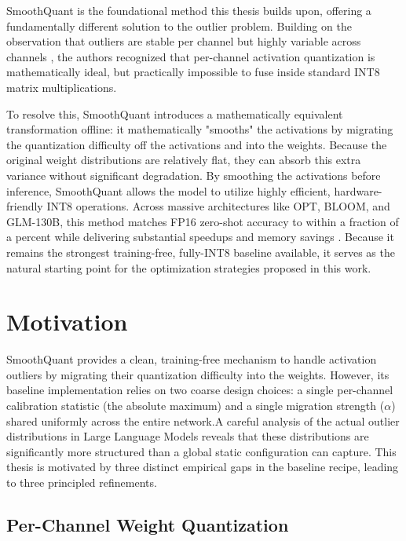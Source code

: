 SmoothQuant \cite{smoothquant_paper} is the foundational method this thesis builds upon, offering a fundamentally different solution to the outlier problem. Building on the observation that outliers are stable per channel but highly variable across channels \cite{llm_int8_paper}, the authors recognized that per-channel activation quantization is mathematically ideal, but practically impossible to fuse inside standard INT8 matrix multiplications.

To resolve this, SmoothQuant introduces a mathematically equivalent transformation offline: it mathematically "smooths" the activations by migrating the quantization difficulty off the activations and into the weights. Because the original weight distributions are relatively flat, they can absorb this extra variance without significant degradation. By smoothing the activations before inference, SmoothQuant allows the model to utilize highly efficient, hardware-friendly INT8 operations. Across massive architectures like OPT, BLOOM, and GLM-130B, this method matches FP16 zero-shot accuracy to within a fraction of a percent while delivering substantial speedups and memory savings \cite{smoothquant_paper}. Because it remains the strongest training-free, fully-INT8 baseline available, it serves as the natural starting point for the optimization strategies proposed in this work.

\section{Motivation}

SmoothQuant provides a clean, training-free mechanism to handle activation outliers by migrating their quantization difficulty into the weights. However, its baseline implementation relies on two coarse design choices: a single per-channel calibration statistic (the absolute maximum) and a single migration strength ($\alpha$) shared uniformly across the entire network.A careful analysis of the actual outlier distributions in Large Language Models reveals that these distributions are significantly more structured than a global static configuration can capture. This thesis is motivated by three distinct empirical gaps in the baseline recipe, leading to three principled refinements.

\subsection{Per-Channel Weight Quantization}

